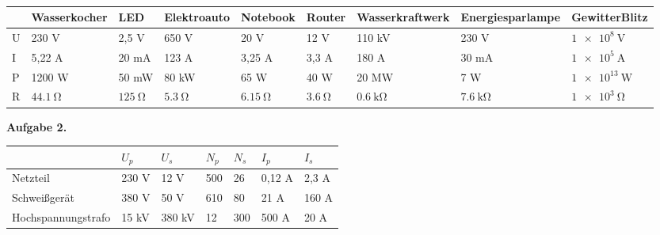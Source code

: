 \documentclass[a4paper]{article}
\begin{document}
\vspace{0.5 cm}

\\
\renewcommand{\arraystretch}{2}
\begin{tabular}{|p{0.5 cm}|p{1.7 cm}|p{1.7 cm}|p{1.7 cm}|p{1.7 cm}|p{1.7 cm}|p{1.7 cm}|p{1.7 cm}|p{1.7 cm}|}
	\hline
	& Wasser\-kocher & LED      & Elektroauto &  Notebook   & Router      & Wasser\-kraftwerk & Energie\-sparlampe & Gewitter\-Blitz\\
	\hline
	U & 230 V       & 2,5 V      &  650 V     &     20 V    & 12 V        &  110 kV           &        230 V       & $\SI{1e8}{\volt}$\\
	\hline
	I &  5,22 A     & 20 mA      &      123 A &    3,25 A   &  3,3 A      &  180 A            &     30 mA          & $\SI{1e5}{\ampere}$\\
	\hline
	P & 1200 W      &  50 mW     &      80 kW &    65 W     &  40 W       & 20 MW             &       7 W          & $\SI{1e13}{\watt}$\\
	\hline
	R &$\SI{44,1}{\ohm}$&$\SI{125}{\ohm}$&$\SI{5,3}{\ohm}$&$\SI{6,15}{\ohm}$&$\SI{3,6}{\ohm}$&$\SI{0,6}{\kilo\ohm}$& $\SI{7,6}{\kilo\ohm}$ & $\SI{1e3}{\ohm}$\\
	\hline
\end{tabular}
\vspace{1 cm}

{\bf Aufgabe 2.}\\

\renewcommand{\arraystretch}{2}
\begin{tabular}{|p{2 cm}|p{2 cm}|p{2 cm}|p{2 cm}|p{2 cm}|p{2 cm}|p{2 cm}|}
	\hline
	& $U_p$ & $U_s$ & $N_p$ & $N_s$ & $I_p$  & $I_s$ \\
	\hline
	Netzteil & 230 V & 12 V  & 500   &  26     & 0,12 A & 2,3 A\\
	\hline
	Schweißgerät & 380 V  & 50 V  & 610   & 80    &  21 A    & 160 A \\
	\hline 
	Hochspan\-nungstrafo & 15 kV  & 380 kV & 12  &  300     & 500 A  & 20 A \\
	\hline
\end{tabular}
\vspace{0.5 cm}
\end{document}
